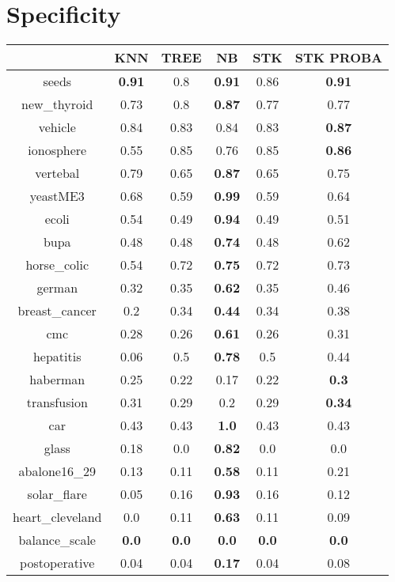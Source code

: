\documentclass{article}%
\begin{document}
\section*{Specificity}%
\begin{tabular}{c|ccccc}%
&KNN&TREE&NB&STK&STK PROBA\\%
\hline%
seeds&\textbf{0.91}&0.8&\textbf{0.91}&0.86&\textbf{0.91}\\%
new\_thyroid&0.73&0.8&\textbf{0.87}&0.77&0.77\\%
vehicle&0.84&0.83&0.84&0.83&\textbf{0.87}\\%
ionosphere&0.55&0.85&0.76&0.85&\textbf{0.86}\\%
vertebal&0.79&0.65&\textbf{0.87}&0.65&0.75\\%
yeastME3&0.68&0.59&\textbf{0.99}&0.59&0.64\\%
ecoli&0.54&0.49&\textbf{0.94}&0.49&0.51\\%
bupa&0.48&0.48&\textbf{0.74}&0.48&0.62\\%
horse\_colic&0.54&0.72&\textbf{0.75}&0.72&0.73\\%
german&0.32&0.35&\textbf{0.62}&0.35&0.46\\%
breast\_cancer&0.2&0.34&\textbf{0.44}&0.34&0.38\\%
cmc&0.28&0.26&\textbf{0.61}&0.26&0.31\\%
hepatitis&0.06&0.5&\textbf{0.78}&0.5&0.44\\%
haberman&0.25&0.22&0.17&0.22&\textbf{0.3}\\%
transfusion&0.31&0.29&0.2&0.29&\textbf{0.34}\\%
car&0.43&0.43&\textbf{1.0}&0.43&0.43\\%
glass&0.18&0.0&\textbf{0.82}&0.0&0.0\\%
abalone16\_29&0.13&0.11&\textbf{0.58}&0.11&0.21\\%
solar\_flare&0.05&0.16&\textbf{0.93}&0.16&0.12\\%
heart\_cleveland&0.0&0.11&\textbf{0.63}&0.11&0.09\\%
balance\_scale&\textbf{0.0}&\textbf{0.0}&\textbf{0.0}&\textbf{0.0}&\textbf{0.0}\\%
postoperative&0.04&0.04&\textbf{0.17}&0.04&0.08\\%
\end{tabular}

%
\end{document}
